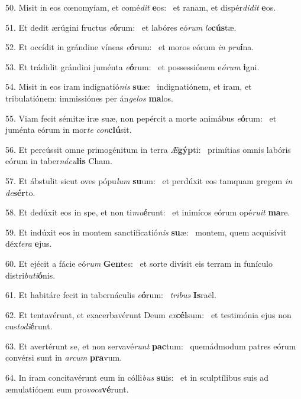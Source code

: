 50. Misit in eos cœnomyíam, et comé\textit{dit} \textbf{e}os: \ast\  et ranam, et dispér\textit{di}\textit{dit} \textbf{e}os.\

51. Et dedit ærúgini fructus \textit{e}\textbf{ó}rum: \ast\  et labóres eó\textit{rum} \textit{lo}\textbf{cús}tæ.\

52. Et occídit in grándine víneas \textit{e}\textbf{ó}rum: \ast\  et moros eórum \textit{in} \textit{pru}\textbf{í}na.\

53. Et trádidit grándini juménta \textit{e}\textbf{ó}rum: \ast\  et possessiónem e\textit{ó}\textit{rum} \textbf{i}gni.\

54. Misit in eos iram indignatió\textit{nis} \textbf{su}æ: \ast\  indignatiónem, et iram, et tribulatiónem: immissiónes per án\textit{ge}\textit{los} \textbf{ma}los.\

55. Viam fecit sémitæ iræ suæ, non pepércit a morte animábus \textit{e}\textbf{ó}rum: \ast\  et juménta eórum in mor\textit{te} \textit{con}\textbf{clú}sit.\

56. Et percússit omne primogénitum in terra \textit{Æ}\textbf{gýp}ti: \ast\  primítias omnis labóris eórum in taber\textit{ná}\textit{cu}\textbf{lis} Cham.\

57. Et ábstulit sicut oves pópu\textit{lum} \textbf{su}um: \ast\  et perdúxit eos tamquam gregem \textit{in} \textit{de}\textbf{sér}to.\

58. Et dedúxit eos in spe, et non ti\textit{mu}\textbf{é}runt: \ast\  et inimícos eórum opé\textit{ru}\textit{it} \textbf{ma}re.\

59. Et indúxit eos in montem sanctificatió\textit{nis} \textbf{su}æ: \ast\  montem, quem acquisívit déx\textit{te}\textit{ra} \textbf{e}jus.\

60. Et ejécit a fácie eó\textit{rum} \textbf{Gen}tes: \ast\  et sorte divísit eis terram in funículo distri\textit{bu}\textit{ti}\textbf{ó}nis.\

61. Et habitáre fecit in tabernáculis \textit{e}\textbf{ó}rum: \ast\  \textit{tri}\textit{bus} \textbf{Is}raël.\

62. Et tentavérunt, et exacerbavérunt Deum \textit{ex}\textbf{cél}sum: \ast\  et testimónia ejus non cus\textit{to}\textit{di}\textbf{é}runt.\

63. Et avertérunt se, et non servavé\textit{runt} \textbf{pac}tum: \ast\  quemádmodum patres eórum convérsi sunt in \textit{ar}\textit{cum} \textbf{pra}vum.\

64. In iram concitavérunt eum in cólli\textit{bus} \textbf{su}is: \ast\  et in sculptílibus suis ad æmulatiónem eum pro\textit{vo}\textit{ca}\textbf{vé}runt.\

